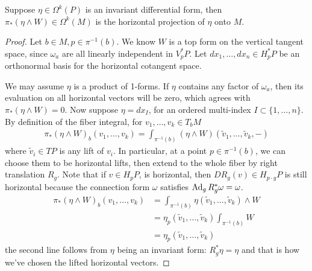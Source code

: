 \begin{prop} \label{prop:integral_horizontal_proj}
	Suppose $\eta \in \Omega^k(P)$ is an invariant differential form, then
	 $\pi_*(\eta \wedge W) \in \Omega^k(M)$ is the horizontal projection of 
	 $\eta$ onto $M$.
\end{prop}
\begin{proof}
	Let $b\in M, p\in \pi^{-1}(b)$. 
	We know  $W$ is a top form on the vertical tangent space, 
	since  $\omega_a$ are all linearly independent in $V_p^*P$. Let
	$dx_1,\ldots,dx_n \in H_p^*P$ be an orthonormal basis for the horizontal
	cotangent space. 

	We may assume $\eta$ is a product of 1-forms. If $\eta$ contains any factor of
	$\omega_a$, then its evaluation on all horizontal vectors will be zero, which
	agrees with $\pi_*(\eta\wedge W) = 0$. Now suppose $\eta = dx_I$, for 
	an ordered multi-index $I\subset\{1,\ldots,n\}$.
	By definition of the fiber integral, for $v_1,\ldots,v_k \in T_bM$
	\begin{align*}
		\pi_*(\eta\wedge W)_b(v_1,\ldots,v_k) 
		= \int_{\pi^{-1}(b)} (\eta\wedge W)(\widetilde{v}_1,\ldots,\widetilde{v}_k,-)
	\end{align*}
	where $\widetilde{v}_i \in TP$ is any lift of $v_i$. In particular, at a
	point $p\in \pi^{-1}(b)$, we can choose them to be horizontal lifts, then
	extend to the whole fiber by right translation $R_g$. Note that if  $v\in H_pP$, is
	horizontal, then  $DR_g(v) \in H_{p\cdot g}P$ is still horizontal because 
	the connection form $\omega$ satisfies  $\operatorname{Ad}_g R_g^* \omega = \omega$. 
	\begin{align*}
		\pi_*(\eta\wedge W)_b(v_1,\ldots,v_k) 
		&= \int_{\pi^{-1}(b)} \eta(\widetilde{v}_1,\ldots,\widetilde{v}_k)\wedge W \\
		&= \eta_p(\widetilde{v}_1,\ldots,\widetilde{v}_k)\int_{\pi^{-1}(b)} W \\
		&= \eta_p(\widetilde{v}_1,\ldots,\widetilde{v}_k) 
	\end{align*}
	the second line follows from $\eta$ being an invariant form: 
	$R_g^*\eta = \eta$ and that is how we've chosen the lifted horizontal
	vectors. 
\end{proof}


